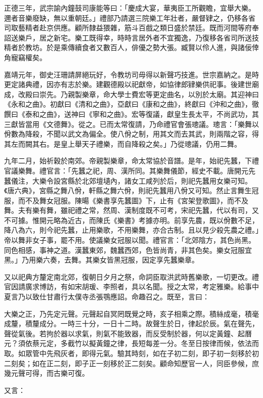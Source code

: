 正德三年，武宗諭內鐘鼓司康能等曰：「慶成大宴，華夷臣工所觀瞻，宜舉大樂。邇者音樂廢缺，無以重朝廷。」禮部乃請選三院樂工年壯者，嚴督肄之，仍移各省司取藝精者赴京供應。顧所隸益猥雜，筋斗百戲之類日盛於禁廷。既而河間等府奉詔送樂戶，居之新宅。樂工既得幸，時時言居外者不宜獨逸，乃復移各省司所送技精者於教坊。於是乘傳續食者又數百人，俳優之勢大張。臧賢以伶人進，與諸佞倖角寵竊權矣。

嘉靖元年，御史汪珊請屏絕玩好，令教坊司毋得以新聲巧技進。世宗嘉納之。是時更定諸典禮，因亦有志於樂。建觀德殿以祀獻帝，如協律郎肄樂供祀事。後建世廟成，改殿曰崇先。乃親製樂章，命大學士費宏等更定曲名，以別於太廟。其迎神曰《永和之曲》。初獻曰《清和之曲》，亞獻曰《康和之曲》，終獻曰《沖和之曲》，徹饌曰《泰和之曲》，送神曰《寧和之曲》。宏等復議，獻皇生長太平，不尚武功，其三獻皆當用《文德舞》。從之。已而太常復請，乃命禮官會張璁議。璁言：「樂舞以佾數為降殺，不聞以武文為偏全。使八佾之制，用其文而去其武，則兩階之容，得其左而闕其右。是皇上舉天子禮樂，而自降殺之矣。」乃從璁議，仍用二舞。

九年二月，始祈穀於南郊。帝親製樂章，命太常協於音譜。是年，始祀先蠶，下禮官議樂舞。禮官言：「先蠶之祀，周、漢所同。其樂舞儀節，經史不載。唐開元先蠶儀注，大樂令設宮縣於北郊壇壝內，諸女工咸列於后，則祀先蠶用女樂可知。《唐六典》，宮縣之舞八佾，軒縣之舞六佾，則祀先蠶用八佾又可知。然止言舞生冠服，而不及舞女冠服。陳暘《樂書享先蠶圖》下，止有《宮架登歌圖》，而不及舞。夫有樂有舞，雖祀禮之常，然周、漢制度既不可考，宋祀先蠶，代以有司，又不可據。惟開元略為近古，而陳氏《樂書》考據亦明。前享先農，既以佾數不足，降八為六，則今祀先蠶，止用樂歌，不用樂舞，亦合古制。且以見少殺先農之禮。」帝以舞非女子事，罷不用。使議樂女冠服以聞。禮官言：「北郊陰方，其色尚黑。同色相感，事神之道。漢蠶東郊，魏蠶西郊，色皆尚青，非其色矣。樂女冠服宜黑。」乃用樂六奏，去舞。其樂女皆黑冠服，因定享先蠶樂章。

又以祀典方釐定南北郊，復朝日夕月之祭，命詞臣取洪武時舊樂歌，一切更改。禮官因請廣求博訪，有如宋胡瑗、李照者，具以名聞。授之太常，考定雅樂。給事中夏言乃以致仕甘肅行太僕寺丞張鶚應詔。命趣召之。既至，言曰：

大樂之正，乃先定元聲。元聲起自冥罔既覺之時，亥子相乘之際。積絲成毫，積毫成釐，積釐成分。一時三十分，一日十二時。故聲生於日，律起於辰。氣在聲先，聲從氣後。若拘於器以求氣，則氣不能致器，而反受制於器，何以定黃鐘、起曆元？須依蔡元定，多截竹以擬黃鐘之律，長短每差一分。冬至日按律而候，依法而取。如眾管中先飛灰者，即得元氣。驗其時刻，如在子初二刻，即子初一刻移於初二刻矣；如在正二刻，即子正一刻移於正二刻矣。顧命知歷官一人，同臣參候，庶幾元聲可得，而古樂可復。

又言：

